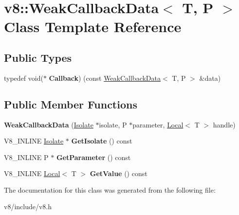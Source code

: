 \hypertarget{classv8_1_1WeakCallbackData}{}\section{v8\+:\+:Weak\+Callback\+Data$<$ T, P $>$ Class Template Reference}
\label{classv8_1_1WeakCallbackData}
\subsection*{Public Types}
\begin{DoxyCompactItemize}
\item 
\hypertarget{classv8_1_1WeakCallbackData_a08a29122f54c663fc2442d8f42c08ac2}{}typedef void($\ast$ {\bfseries Callback}) (const \hyperlink{classv8_1_1WeakCallbackData}{Weak\+Callback\+Data}$<$ T, P $>$ \&data)\label{classv8_1_1WeakCallbackData_a08a29122f54c663fc2442d8f42c08ac2}

\end{DoxyCompactItemize}
\subsection*{Public Member Functions}
\begin{DoxyCompactItemize}
\item 
\hypertarget{classv8_1_1WeakCallbackData_a804314135aa731fcab6d57aafddd26d3}{}{\bfseries Weak\+Callback\+Data} (\hyperlink{classv8_1_1Isolate}{Isolate} $\ast$isolate, P $\ast$parameter, \hyperlink{classv8_1_1Local}{Local}$<$ T $>$ handle)\label{classv8_1_1WeakCallbackData_a804314135aa731fcab6d57aafddd26d3}

\item 
\hypertarget{classv8_1_1WeakCallbackData_a499a971756182b5b52c28e506339c6b9}{}V8\+\_\+\+I\+N\+L\+I\+N\+E \hyperlink{classv8_1_1Isolate}{Isolate} $\ast$ {\bfseries Get\+Isolate} () const \label{classv8_1_1WeakCallbackData_a499a971756182b5b52c28e506339c6b9}

\item 
\hypertarget{classv8_1_1WeakCallbackData_a96ce7e1fbbfd56d0709225623517ff17}{}V8\+\_\+\+I\+N\+L\+I\+N\+E P $\ast$ {\bfseries Get\+Parameter} () const \label{classv8_1_1WeakCallbackData_a96ce7e1fbbfd56d0709225623517ff17}

\item 
\hypertarget{classv8_1_1WeakCallbackData_a0e8fcf0091132c96d548ac319284710a}{}V8\+\_\+\+I\+N\+L\+I\+N\+E \hyperlink{classv8_1_1Local}{Local}$<$ T $>$ {\bfseries Get\+Value} () const \label{classv8_1_1WeakCallbackData_a0e8fcf0091132c96d548ac319284710a}

\end{DoxyCompactItemize}


The documentation for this class was generated from the following file\+:\begin{DoxyCompactItemize}
\item 
v8/include/v8.\+h\end{DoxyCompactItemize}

